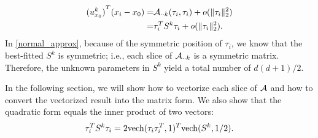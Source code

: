 \documentclass{article}
\theoremstyle{remark}
\begin{document}
\begin{equation}\label{normal_approx}
\begin{aligned}
 {(u^k_{x_0})}^T (x_i -x_0) 
=&{\cal A}_{\cdot\cdot k}(\tau_i,\tau_i) +  o(\|\tau_i\|_2^2)\\
=&\tau_i^T S^{k}\tau_i + o(\|\tau_i\|_2^2).
\end{aligned}
\end{equation}
In \eqref{normal_approx}, because of the symmetric position of $\tau_i$, we know that the best-fitted $S^k$ is symmetric; i.e., each slice of ${\cal A}_{\cdot\cdot k}$ is a symmetric matrix. Therefore, the unknown parameters in $S^k$ yield a total number of ${d(d+1)}/{2}$. 


In the following section, we will show how to vectorize each slice of $\cal A$ and  how to convert the vectorized result into the matrix form. We also show that the quadratic form equals the inner product of two vectors:
\[
\tau_i^T S^{k}\tau_i  = 2{\rm vech}(\tau_i\tau_i^T,1)^T {\rm vech}(S^k,1/2).
\]
\end{document}
